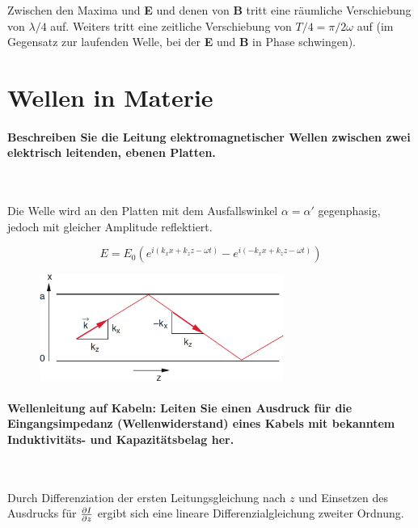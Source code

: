 \documentclass[a4paper, 11pt, ngerman, parskip=half-]{scrartcl}
\begin{document}
Zwischen den Maxima und \textbf{E} und denen von \textbf{B} tritt eine räumliche Verschiebung von
$\lambda/4$ auf. Weiters tritt eine zeitliche Verschiebung von $T/4 = \pi / 2 \omega$ auf (im
Gegensatz zur laufenden Welle, bei der \textbf{E} und \textbf{B} in Phase schwingen).

\newpage

\section{Wellen in Materie}

\paragraph{Beschreiben Sie die Leitung elektromagnetischer Wellen zwischen zwei elektrisch
leitenden, ebenen Platten.} ~

Die Welle wird an den Platten mit dem Ausfallswinkel $\alpha = \alpha'$ gegenphasig, jedoch mit
gleicher Amplitude reflektiert.

\begin{equation}
    E = E_0(e^{i(k_x x + k_z z - \omega t)} - e^{i(-k_x x + k_z z - \omega t)})
\end{equation}

\begin{figure}[H]
    \centering
    \includegraphics[width=8cm]{image/14/1}
\end{figure}

\paragraph{Wellenleitung auf Kabeln: Leiten Sie einen Ausdruck für die Eingangsimpedanz
(Wellenwiderstand) eines Kabels mit bekanntem Induktivitäts- und Kapazitätsbelag her.} ~

Durch Differenziation der ersten Leitungsgleichung nach $z$ und Einsetzen des Ausdrucks für
$\pdv{I}{z}$ ergibt sich eine lineare Differenzialgleichung zweiter Ordnung.
\end{document}
